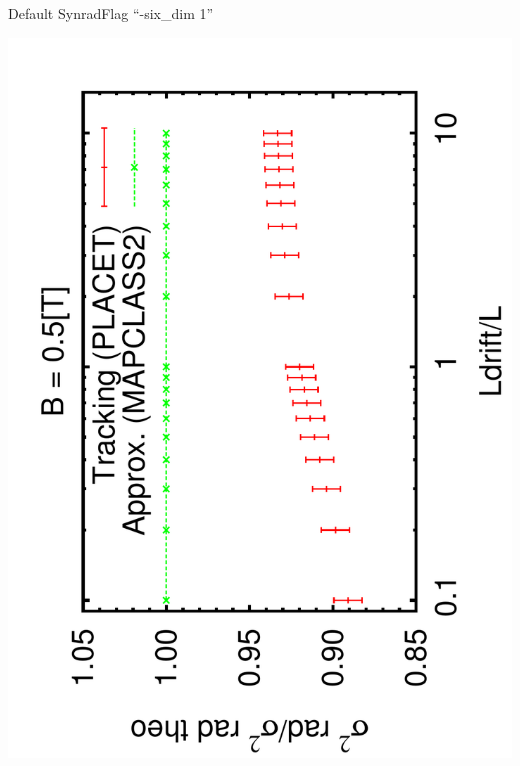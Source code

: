 \documentclass{beamer}
\begin{document}
\begin{frame}
  \hspace*{2.3cm}Default Synrad\hspace*{3.3cm}Flag ``-six\_dim 1''\par
 \includegraphics[scale=0.24,angle=-90]{sigma_Ldrift.pdf}

\end{frame}
\end{document}
